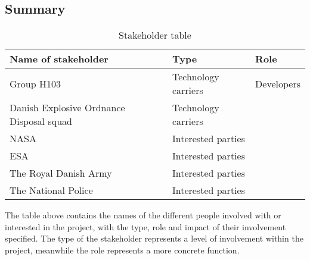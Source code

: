 \subsection{Summary}
\begin{table}[H]
	\begin{tabular}{ | p{5cm} | l | p{5cm} |}
	   	\hline
	   	\bfseries Name of stakeholder & \bfseries Type & \bfseries Role \\ \hline
	   	Group H103 & Technology carriers & Developers \\ \hline
	   	Danish Explosive Ordnance Disposal squad & Technology carriers &  \\ \hline
 	   	NASA & Interested parties &  \\ \hline
 	   	ESA & Interested parties &  \\ \hline
 	   	The Royal Danish Army & Interested parties & \\ \hline
 	   	The National Police & Interested parties &  \\
	   	\hline
	\end{tabular}
	\caption{Stakeholder table}
	\label{table:stakeholdertable}
\end{table}

The table above contains the names of the different people involved with or interested in the project, with the type, role and impact of their involvement specified. The type of the stakeholder represents a level of involvement within the project, meanwhile the role represents a more concrete function.

